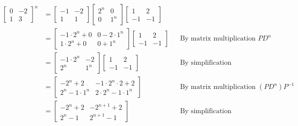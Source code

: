 \documentclass[10pt,letterpaper,final]{report}
\newcommand{\reason}[1]{&& \text{#1}}
\begin{document}
\begin{align*}
  \begin{bmatrix}
    0 & -2 \\
    1 & 3
  \end{bmatrix}^n & = \begin{bmatrix}
                        -1 & -2 \\
                        1  & 1
                      \end{bmatrix}\begin{bmatrix}
                                     2^n & 0   \\
                                     0   & 1^n
                                   \end{bmatrix}\begin{bmatrix}
                                                  1  & 2  \\
                                                  -1 & -1
                                                \end{bmatrix}                            \\[1ex]
                    & = \begin{bmatrix}
                          -1 \cdot 2^n + 0 & 0 - 2 \cdot 1^n \\
                          1 \cdot 2^n + 0  & 0 + 1^n
                        \end{bmatrix}\begin{bmatrix}
                                       1  & 2  \\
                                       -1 & -1
                                     \end{bmatrix} \reason{By matrix multiplication $PD^n$} \\[1ex]
                    & = \begin{bmatrix}
                          -1 \cdot 2^n & -2  \\
                          2^n          & 1^n
                        \end{bmatrix}\begin{bmatrix}
                                       1  & 2  \\
                                       -1 & -1
                                     \end{bmatrix} \reason{By simplification}               \\[1ex]
                    & = \begin{bmatrix}
                          -2^n + 2          & -1 \cdot 2^n \cdot 2 + 2  \\
                          2^n - 1 \cdot 1^n & 2 \cdot 2^n - 1 \cdot 1^n
                        \end{bmatrix} \reason{By matrix multiplication $(PD^n)P^{-1}$}      \\[1ex]
                    & = \begin{bmatrix}
                          -2^n + 2 & -2^{n+1} + 2 \\
                          2^n - 1  & 2^{n+1} - 1
                        \end{bmatrix} \reason{By simplification}
\end{align*}
\end{document}
